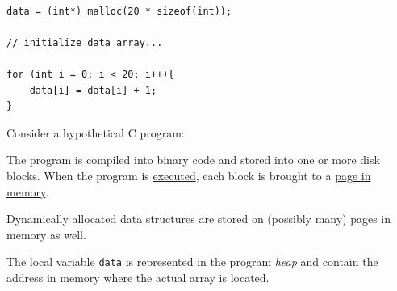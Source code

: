 \newsavebox\CExample
\begin{lrbox}{\CExample}
\begin{lstlisting}[style=C]

data = (int*) malloc(20 * sizeof(int));

// initialize data array...

for (int i = 0; i < 20; i++){
    data[i] = data[i] + 1;
}
\end{lstlisting}
\end{lrbox}



\begin{frame}[fragile]

Consider a hypothetical C program:

\begin{center}
\framebox{\scalebox{0.75}{\usebox{\CExample}}}
\end{center}

The program is compiled into binary code and stored into one or more disk blocks. When the program is \underline{executed}, each block is brought to a \underline{page in memory}.

Dynamically allocated data structures are stored on (possibly many) pages in memory as well.

The local variable \lstinline[style=C]!data! is represented in the program \emph{heap} and contain the address in memory where the actual array is located.

\end{frame}


%

